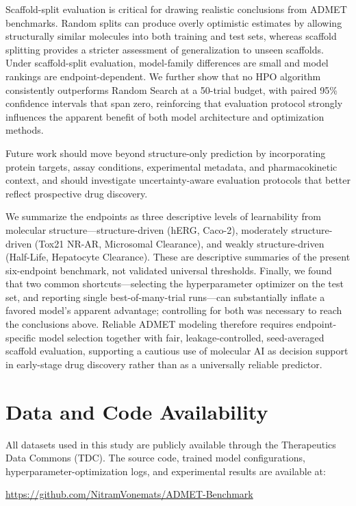 \documentclass[journal]{IEEEtran}
\begin{document}
Scaffold-split evaluation is critical for drawing realistic conclusions from ADMET benchmarks. Random splits can produce overly optimistic estimates by allowing structurally similar molecules into both training and test sets, whereas scaffold splitting provides a stricter assessment of generalization to unseen scaffolds. Under scaffold-split evaluation, model-family differences are small and model rankings are endpoint-dependent. We further show that no HPO algorithm consistently outperforms Random Search at a 50-trial budget, with paired 95\% confidence intervals that span zero, reinforcing that evaluation protocol strongly influences the apparent benefit of both model architecture and optimization methods.

Future work should move beyond structure-only prediction by incorporating protein targets, assay conditions, experimental metadata, and pharmacokinetic context, and should investigate uncertainty-aware evaluation protocols that better reflect prospective drug discovery.

We summarize the endpoints as three descriptive levels of learnability from molecular structure---structure-driven (hERG, Caco-2), moderately structure-driven (Tox21 NR-AR, Microsomal Clearance), and weakly structure-driven (Half-Life, Hepatocyte Clearance). These are descriptive summaries of the present six-endpoint benchmark, not validated universal thresholds. Finally, we found that two common shortcuts---selecting the hyperparameter optimizer on the test set, and reporting single best-of-many-trial runs---can substantially inflate a favored model's apparent advantage; controlling for both was necessary to reach the conclusions above. Reliable ADMET modeling therefore requires endpoint-specific model selection together with fair, leakage-controlled, seed-averaged scaffold evaluation, supporting a cautious use of molecular AI as decision support in early-stage drug discovery rather than as a universally reliable predictor.


\section*{Data and Code Availability}
All datasets used in this study are publicly available through the Therapeutics Data Commons (TDC). The source code, trained model configurations, hyperparameter-optimization logs, and experimental results are available at:
\begin{center}
\url{https://github.com/NitramVonemats/ADMET-Benchmark}
\end{center}
\end{document}
